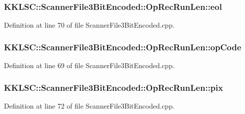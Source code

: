 \subsubsection[{\texorpdfstring{eol}{eol}}]{ K\+K\+L\+S\+C\+::\+Scanner\+File3\+Bit\+Encoded\+::\+Op\+Rec\+Run\+Len\+::eol}\hypertarget{struct_scanner_file3_bit_encoded_1_1_op_rec_run_len_a243e601ba7e1c263d98b226bfd88b60c}{}\label{struct_scanner_file3_bit_encoded_1_1_op_rec_run_len_a243e601ba7e1c263d98b226bfd88b60c}


Definition at line 70 of file Scanner\+File3\+Bit\+Encoded.\+cpp.

\subsubsection[{\texorpdfstring{op\+Code}{opCode}}]{ K\+K\+L\+S\+C\+::\+Scanner\+File3\+Bit\+Encoded\+::\+Op\+Rec\+Run\+Len\+::op\+Code}\hypertarget{struct_scanner_file3_bit_encoded_1_1_op_rec_run_len_aa7fa2269190d681438094ca22923e9ec}{}\label{struct_scanner_file3_bit_encoded_1_1_op_rec_run_len_aa7fa2269190d681438094ca22923e9ec}


Definition at line 69 of file Scanner\+File3\+Bit\+Encoded.\+cpp.

\subsubsection[{\texorpdfstring{pix}{pix}}]{ K\+K\+L\+S\+C\+::\+Scanner\+File3\+Bit\+Encoded\+::\+Op\+Rec\+Run\+Len\+::pix}\hypertarget{struct_scanner_file3_bit_encoded_1_1_op_rec_run_len_a034a8dac6fcbf46981263f58a0998a86}{}\label{struct_scanner_file3_bit_encoded_1_1_op_rec_run_len_a034a8dac6fcbf46981263f58a0998a86}


Definition at line 72 of file Scanner\+File3\+Bit\+Encoded.\+cpp.

